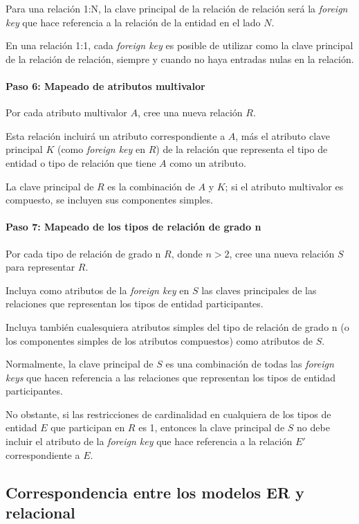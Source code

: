 Para una relación 1:N, la clave principal de la relación de relación será la \textit{foreign key} que hace referencia a la relación de la entidad en el lado $N$.


En una relación 1:1, cada \textit{foreign key} es posible de utilizar como la clave principal de la relación de relación, siempre y cuando no haya entradas nulas en la relación.


\paragraph*{Paso 6: Mapeado de atributos multivalor}

Por cada atributo multivalor $A$, cree una nueva relación $R$.


Esta relación incluirá un atributo correspondiente a $A$, más el atributo clave principal $K$ (como \textit{foreign key} en $R$) de la relación que representa el tipo de entidad o tipo de relación que tiene $A$ como un atributo.


La clave principal de $R$ es la combinación de $A$ y $K$; si el atributo multivalor es compuesto, se incluyen sus componentes simples.


\paragraph*{Paso 7: Mapeado de los tipos de relación de grado n}
Por cada tipo de relación de grado n $R$, donde $n > 2$, cree una nueva relación $S$ para representar $R$.


Incluya como atributos de la \textit{foreign key} en $S$ las claves principales de las relaciones que representan los tipos de entidad participantes. 


Incluya también cualesquiera atributos simples del tipo de relación de grado n (o los componentes simples de los atributos compuestos) como atributos de $S$.


Normalmente, la clave principal de $S$ es una combinación de todas las \textit{foreign keys} que hacen referencia a las relaciones que representan los tipos de entidad participantes.


No obstante, si las restricciones de cardinalidad en cualquiera de los tipos de entidad $E$ que participan en $R$ es 1, entonces la clave principal de $S$ no debe incluir el atributo de la \textit{foreign key} que hace referencia a la relación $E'$ correspondiente a $E$.

\subsection*{Correspondencia entre los modelos ER y relacional}

